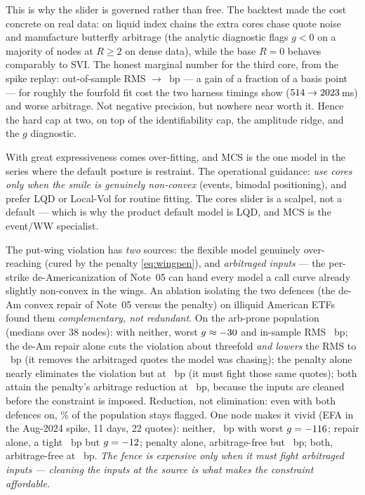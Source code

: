 \documentclass[11pt]{article}
\begin{document}
This is why the slider is governed rather than free.  The backtest made the cost
concrete on real data: on liquid index chains the extra cores chase quote noise
and manufacture butterfly arbitrage (the analytic diagnostic flags $g<0$ on a
majority of nodes at $R\ge2$ on dense data), while the base $R=0$ behaves
comparably to SVI.  The honest marginal number for the third core, from the
spike replay: out-of-sample RMS \mcscorroosbefore$\to$\mcscorroosafter\ bp ---
a gain of a fraction of a basis point --- for roughly the fourfold fit cost
the two harness timings show
($514\to2023$\,ms) and worse arbitrage.
Not negative precision, but nowhere near worth it.  Hence the hard cap at two,
on top of the identifiability cap, the amplitude ridge, and the $g$ diagnostic.

\begin{caution}
With great expressiveness comes over-fitting, and MCS is the one model in the
series where the default posture is restraint.  The operational guidance:
\emph{use cores only when the smile is genuinely non-convex} (events, bimodal
positioning), and prefer LQD or Local-Vol for routine fitting.  The cores slider
is a scalpel, not a default --- which is why the product default model is LQD,
and MCS is the event/WW specialist.
\end{caution}

\begin{example}[title={Case file: two defences, one pathology}]
The put-wing violation has \emph{two} sources: the flexible model genuinely
over-reaching (cured by the penalty \eqref{eq:wingpen}), and \emph{arbitraged
inputs} --- the per-strike de-Americanization of Note~05 can hand every model a
call curve already slightly non-convex in the wings.  An ablation isolating the
two defences (the de-Am convex repair of Note~05 versus the penalty) on illiquid
American ETFs found them \emph{complementary, not redundant}.  On the arb-prone
population (medians over 38 nodes): with neither, worst $g\approx-30$
and in-sample RMS \mcscorrablnonerms\ bp; the de-Am repair alone cuts the
violation about threefold \emph{and lowers} the RMS to \mcscorrablrepairrms\ bp
(it removes the arbitraged quotes the model was chasing); the penalty alone
nearly eliminates the violation but at \mcscorrablpenaltyrms\ bp (it must fight
those same quotes); both attain the penalty's arbitrage reduction at
\mcscorrablbothrms\ bp, because the inputs are cleaned before the constraint is
imposed.  Reduction, not elimination: even with both defences on,
\mcscorrablflaggedpct\% of the population stays flagged.  One node makes it
vivid (EFA in the Aug-2024 spike, 11 days, 22 quotes): neither,
\mcscorrefanonerms\ bp with worst $g=-116$; repair alone, a tight
\mcscorrefarepairrms\ bp but $g=-12$; penalty alone,
arbitrage-free but \mcscorrefapenaltyrms\ bp; both, arbitrage-free at
\mcscorrefabothrms\ bp.  \emph{The fence is expensive only when it must fight
arbitraged inputs --- cleaning the inputs at the source is what makes the
constraint affordable.}
\end{example}
\end{document}
